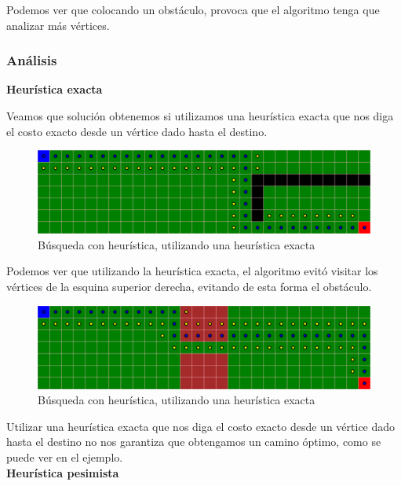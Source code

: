 Podemos ver que colocando un obstáculo, provoca que el algoritmo tenga que analizar más vértices.

\subsubsection{Análisis}
\textbf{Heurística exacta}

Veamos que solución obtenemos si utilizamos una heurística exacta que nos diga el costo exacto desde un vértice dado hasta el destino.


\begin{figure}[H]
\centering
\includegraphics[width=\textwidth]{BestSearch/grafo3HeuristicaExacta.png}
\caption{Búsqueda con heurística, utilizando una heurística exacta}
\end{figure}
Podemos ver que utilizando la heurística exacta, el algoritmo evitó visitar los vértices de la esquina superior derecha, evitando de esta forma el obstáculo.

\begin{figure}[H]
\centering
\includegraphics[width=\textwidth]{BestSearch/grafo1HeuristicaExacta.png}
\caption{Búsqueda con heurística, utilizando una heurística exacta}
\end{figure}
Utilizar una heurística exacta que nos diga el costo exacto desde un vértice dado hasta el destino no nos garantiza que obtengamos un camino óptimo, como se puede ver en el ejemplo.
\\


\textbf{Heurística pesimista}

